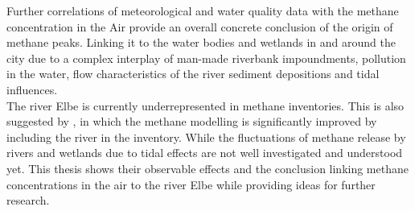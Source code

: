 Further correlations of meteorological and water quality data with the methane concentration in the Air provide an overall concrete conclusion of the origin of methane peaks. Linking it to the water bodies and wetlands in and around the city due to a complex interplay of man-made riverbank impoundments, pollution in the water, flow characteristics of the river sediment depositions and tidal influences.\\
The river Elbe is currently underrepresented in methane inventories. This is also suggested by \cite{Forstmaier.2023}, in which the methane modelling is significantly improved by including the river in the inventory. While the fluctuations of methane release by rivers and wetlands due to tidal effects are not well investigated and understood yet. This thesis shows their observable effects and the conclusion linking methane concentrations in the air to the river Elbe while providing ideas for further research.
